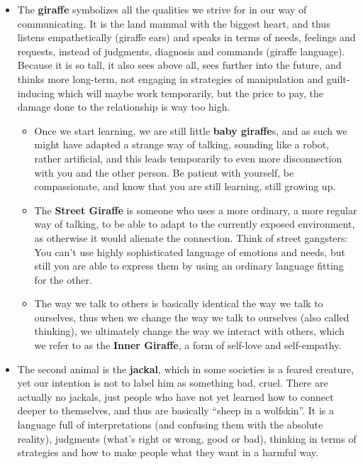 \begin{itemize}
    \item The \textbf{giraffe} symbolizes all the qualities we strive for in our way of communicating.
    It is the land mammal with the biggest heart, and thus listens empathetically (giraffe ears) and speaks in terms of needs, feelings and requests, instead of judgments, diagnosis and commands (giraffe language).
    Because it is so tall, it also sees above all, sees further into the future, and thinks more long-term, not engaging in strategies of manipulation and guilt-inducing which will maybe work temporarily, but the price to pay, the damage done to the relationship is way too high.
    \begin{itemize}
        \item Once we start learning, we are still little \textbf{baby giraffe}s, and as such we might have adapted a strange way of talking, sounding like a robot, rather artificial, and this leads temporarily to even more disconnection with you and the other person.
        Be patient with yourself, be compassionate, and know that you are still learning, still growing up.
        \item The \textbf{Street Giraffe} is someone who uses a more ordinary, a more regular way of talking, to be able to adapt to the currently exposed environment, as otherwise it would alienate the connection.
        Think of street gangsters: You can't use highly sophisticated language of emotions and needs, but still you are able to express them by using an ordinary language fitting for the other.
        \item The way we talk to others is basically identical the way we talk to ourselves, thus when we change the way we talk to ourselves (also called thinking), we ultimately change the way we interact with others, which we refer to as the \textbf{Inner Giraffe}, a form of self-love and self-empathy.
    \end{itemize}
    \item The second animal is the \textbf{jackal}, which in some societies is a feared creature, yet our intention is not to label him as something bad, cruel.
    There are actually no jackals, just people who have not yet learned how to connect deeper to themselves, and thus are basically ``sheep in a wolfskin''.
    It is a language full of interpretations (and confusing them with the absolute reality), judgments (what's right or wrong, good or bad), thinking in terms of strategies and how to make people what they want in a harmful way.

\end{itemize}
